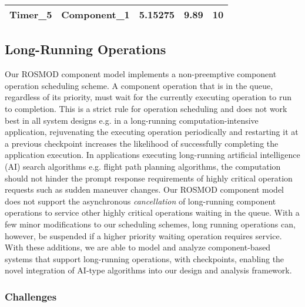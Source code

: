\begin{table}[]
\begin{tabular}{|c|c|c|c|c|}
		Timer\_5                                                          & Component\_1                                                      & 5.15275                                                                   & 9.89                                                                         & 10                                                               \\ \hline
	\end{tabular}
\end{table}

\subsection{Long-Running Operations}
\label{sec:long_running_operations}

Our ROSMOD component model implements a non-preemptive component operation scheduling scheme. A component operation that is in the queue, regardless of its priority, must wait for the currently executing operation to run to completion. This is a strict rule for operation scheduling and does not work best in all system designs e.g. in a long-running computation-intensive application, rejuvenating the executing operation periodically and restarting it at a previous checkpoint increases the likelihood of successfully completing the application execution. In applications executing long-running artificial intelligence (AI) search algorithms e.g. flight path planning algorithms, the computation should not hinder the prompt response requirements of highly critical operation requests such as sudden maneuver changes. Our ROSMOD component model does not support the asynchronous \emph{cancellation} of long-running component operations to service other highly critical operations waiting in the queue. With a few minor modifications to our scheduling schemes, long running operations can, however, be suspended if a higher priority waiting operation requires service. With these additions, we are able to model and analyze component-based systems that support long-running operations, with checkpoints, enabling the novel integration of AI-type algorithms into our design and analysis framework. 

\subsubsection{Challenges}


